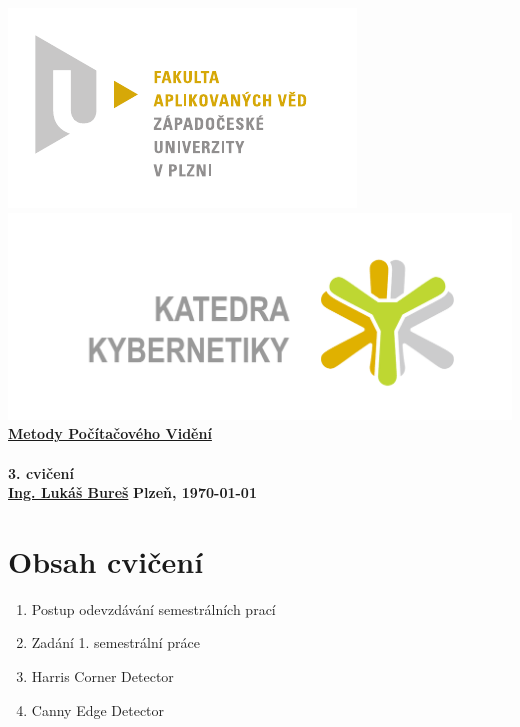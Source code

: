 \documentclass[12pt, a4paper]{article}
\newcommand{\cisloCviceni}{3. cvičení}
\begin{document}
 









 
\begin{titlepage}
\begin{center}
	\includegraphics[trim = 0.6cm 0.5cm 0.9cm 0.5cm, scale=1]{./FAV_logo_cz.pdf}
	\hspace*{\fill}
	\includegraphics[trim = 3.5cm 1.5cm 2.6cm 2cm, scale=0.295]{./KKY_logo_cz.pdf}\\
	\vspace*{\fill}
	\textbf{\Huge{\href{http://www.kky.zcu.cz/cs/courses/mpv}{Metody Počítačového Vidění} \\ ~ \\ \cisloCviceni}}\\
	\vspace*{\fill}
	\textbf{\large{\href{mailto:LBures@kky.zcu.cz}{Ing. Lukáš Bureš}}} \hfill \textbf{\large{Plzeň, \today}}
\end{center}
\end{titlepage}












\section*{Obsah cvičení}
\begin{enumerate}
	\item Postup odevzdávání semestrálních prací
	\item Zadání 1. semestrální práce
	\item Harris Corner Detector
	\item Canny Edge Detector
\end{enumerate}
\end{document}
